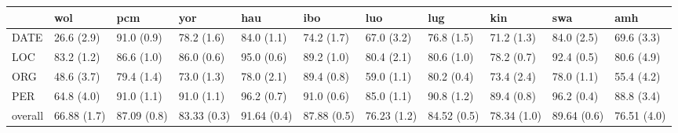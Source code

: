 \begin{tabular}{lllllllllll}
\toprule
{} &          wol &          pcm &          yor &          hau &          ibo &          luo &          lug &          kin &          swa &          amh \\
\midrule
DATE    &   26.6 (2.9) &   91.0 (0.9) &   78.2 (1.6) &   84.0 (1.1) &   74.2 (1.7) &   67.0 (3.2) &   76.8 (1.5) &   71.2 (1.3) &   84.0 (2.5) &   69.6 (3.3) \\
LOC     &   83.2 (1.2) &   86.6 (1.0) &   86.0 (0.6) &   95.0 (0.6) &   89.2 (1.0) &   80.4 (2.1) &   80.6 (1.0) &   78.2 (0.7) &   92.4 (0.5) &   80.6 (4.9) \\
ORG     &   48.6 (3.7) &   79.4 (1.4) &   73.0 (1.3) &   78.0 (2.1) &   89.4 (0.8) &   59.0 (1.1) &   80.2 (0.4) &   73.4 (2.4) &   78.0 (1.1) &   55.4 (4.2) \\
PER     &   64.8 (4.0) &   91.0 (1.1) &   91.0 (1.1) &   96.2 (0.7) &   91.0 (0.6) &   85.0 (1.1) &   90.8 (1.2) &   89.4 (0.8) &   96.2 (0.4) &   88.8 (3.4) \\
overall &  66.88 (1.7) &  87.09 (0.8) &  83.33 (0.3) &  91.64 (0.4) &  87.88 (0.5) &  76.23 (1.2) &  84.52 (0.5) &  78.34 (1.0) &  89.64 (0.6) &  76.51 (4.0) \\
\bottomrule
\end{tabular}

